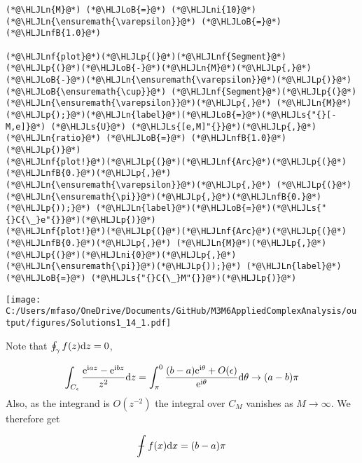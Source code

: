 \documentclass[12pt,a4paper]{article}
\newcommand{\HLJLn}[1]{#1}
\newcommand{\HLJLnf}[1]{\textcolor[RGB]{66,102,213}{#1}}
\newcommand{\HLJLs}[1]{\textcolor[RGB]{201,61,57}{#1}}
\newcommand{\HLJLnfB}[1]{\textcolor[RGB]{59,151,46}{#1}}
\newcommand{\HLJLni}[1]{\textcolor[RGB]{59,151,46}{#1}}
\newcommand{\HLJLoB}[1]{\textcolor[RGB]{102,102,102}{\textbf{#1}}}
\newcommand{\HLJLp}[1]{#1}
\def\D{ {\rm d} }
\def\I{ {\rm i} }
\def\E{ {\rm e} }
\def\Xint#1{ \mathchoice
   {\XXint\displaystyle\textstyle{#1} }%
   {\XXint\textstyle\scriptstyle{#1} }%
   {\XXint\scriptstyle\scriptscriptstyle{#1} }%
   {\XXint\scriptscriptstyle\scriptscriptstyle{#1} }%
   \!\int}
\def\XXint#1#2#3{ {\setbox0=\hbox{$#1{#2#3}{\int}$}
     \vcenter{\hbox{$#2#3$}}\kern-.5\wd0} }
\def\dashint{\Xint-}
\def\dx{\D x}
\def\dz{\D z}
\begin{document}
\begin{lstlisting}
(*@\HLJLn{M}@*) (*@\HLJLoB{=}@*) (*@\HLJLni{10}@*)
(*@\HLJLn{\ensuremath{\varepsilon}}@*) (*@\HLJLoB{=}@*) (*@\HLJLnfB{1.0}@*)

(*@\HLJLnf{plot}@*)(*@\HLJLp{(}@*)(*@\HLJLnf{Segment}@*)(*@\HLJLp{(}@*)(*@\HLJLoB{-}@*)(*@\HLJLn{M}@*)(*@\HLJLp{,}@*) (*@\HLJLoB{-}@*)(*@\HLJLn{\ensuremath{\varepsilon}}@*)(*@\HLJLp{)}@*) (*@\HLJLoB{\ensuremath{\cup}}@*) (*@\HLJLnf{Segment}@*)(*@\HLJLp{(}@*)(*@\HLJLn{\ensuremath{\varepsilon}}@*)(*@\HLJLp{,}@*) (*@\HLJLn{M}@*)(*@\HLJLp{);}@*)(*@\HLJLn{label}@*)(*@\HLJLoB{=}@*)(*@\HLJLs{"{}[-M,e]}@*) (*@\HLJLs{U}@*) (*@\HLJLs{[e,M]"{}}@*)(*@\HLJLp{,}@*) (*@\HLJLn{ratio}@*) (*@\HLJLoB{=}@*) (*@\HLJLnfB{1.0}@*)(*@\HLJLp{)}@*)
(*@\HLJLnf{plot!}@*)(*@\HLJLp{(}@*)(*@\HLJLnf{Arc}@*)(*@\HLJLp{(}@*)(*@\HLJLnfB{0.}@*)(*@\HLJLp{,}@*)(*@\HLJLn{\ensuremath{\varepsilon}}@*)(*@\HLJLp{,}@*) (*@\HLJLp{(}@*)(*@\HLJLn{\ensuremath{\pi}}@*)(*@\HLJLp{,}@*)(*@\HLJLnfB{0.}@*)(*@\HLJLp{));}@*) (*@\HLJLn{label}@*)(*@\HLJLoB{=}@*)(*@\HLJLs{"{}C{\_}e"{}}@*)(*@\HLJLp{)}@*)
(*@\HLJLnf{plot!}@*)(*@\HLJLp{(}@*)(*@\HLJLnf{Arc}@*)(*@\HLJLp{(}@*)(*@\HLJLnfB{0.}@*)(*@\HLJLp{,}@*) (*@\HLJLn{M}@*)(*@\HLJLp{,}@*) (*@\HLJLp{(}@*)(*@\HLJLni{0}@*)(*@\HLJLp{,}@*)(*@\HLJLn{\ensuremath{\pi}}@*)(*@\HLJLp{));}@*) (*@\HLJLn{label}@*) (*@\HLJLoB{=}@*) (*@\HLJLs{"{}C{\_}M"{}}@*)(*@\HLJLp{)}@*)
\end{lstlisting}

\texttt{[image: C:/Users/mfaso/OneDrive/Documents/GitHub/M3M6AppliedComplexAnalysis/output/figures/Solutions1\_14\_1.pdf]}

Note that $\oint_\gamma f(z) \dz = 0$,

\[
\int_{C_\epsilon} {\E^{\I a z } - \E^{\I b z} \over z^2} \dz =
 \int_\pi^0 { (b-a) \E^{\I \theta}  + O(\epsilon) \over \E^{ \I \theta}} \D\theta \rightarrow (a-b) \pi
\]
Also, as the integrand is $O(z^{-2})$ the integral over $C_M$ vanishes as $M \rightarrow \infty$. We therefore get

\[
    \dashint f(x)\dx = (b-a)\pi
\]
\end{document}
